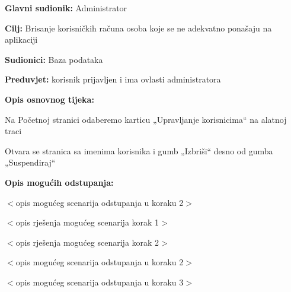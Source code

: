 	\noindent {}
\begin{packed_item}
	
	\item \textbf{Glavni sudionik: }Administrator
	\item  \textbf{Cilj:} Brisanje korisničkih računa osoba koje se ne adekvatno ponašaju na aplikaciji
	\item  \textbf{Sudionici:}
	Baza podataka
	\item  \textbf{Preduvjet:} korisnik prijavljen i ima ovlasti administratora
	\item  \textbf{Opis osnovnog tijeka:}
	
	\item[] \begin{packed_enum}
		
		\item	Na Početnoj stranici odaberemo karticu „Upravljanje korisnicima“ na alatnoj traci
		\item	Otvara se stranica sa imenima korisnika i gumb „Izbriši“ desno od gumba „Suspendiraj“ 
		
	\end{packed_enum}
	
	\item  \textbf{Opis mogućih odstupanja:}
	
	\item[] \begin{packed_item}
		
		\item[2.a] $<$opis mogućeg scenarija odstupanja u koraku 2$>$
		\item[] \begin{packed_enum}
			
			\item $<$opis rješenja mogućeg scenarija korak 1$>$
			\item $<$opis rješenja mogućeg scenarija korak 2$>$
			
		\end{packed_enum}
		\item[2.b] $<$opis mogućeg scenarija odstupanja u koraku 2$>$
		\item[3.a] $<$opis mogućeg scenarija odstupanja  u koraku 3$>$
		
	\end{packed_item}
\end{packed_item}

